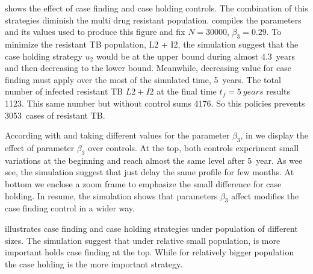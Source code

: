 %
	 shows the effect of case finding and 
case holding controls. The combination of this strategies diminish the multi 
drug resistant population.  compiles the 
parameters and its values used to produce this figure and fix 
$N = \num{30000}$, $\beta_3 = \num{0.29}$. To minimize the resistant TB 
population, L2 + I2, the simulation suggest that the case holding strategy 
$u_2$ would be at the upper bound during almost \SI{4.3}{years} and then 
decreasing to the lower bound. Meanwhile, decreasing value for case finding
must apply over the most of the simulated time, \SI{5}{years}. The total number 
of 
infected resistant TB $L2 + I2$  at the final time $t_f = \SI{5}{years}$ results
\num{1123}. This same number but without control sums 4176. So this policies 
prevents \SI{3053}{cases} of resistant TB.

  According with  and taking different values
for the parameter $\beta_3$, in  we display 
the effect of parameter $\beta_3$ over controls. 
At the top, both controls experiment small variations 
at the beginning and reach almost the same level after \SI{5}{year}. 
As wee see, the simulation suggest that just delay the same profile for few 
months. At bottom we enclose  a zoom frame to emphasize the small difference for
case holding. In resume, the simulation shows that parameters $\beta_3$ affect 
modifies the case finding control in a wider way.

	 illustrates case finding and case holding 
strategies under population of different sizes. The simulation suggest that
under relative small population, is more important holds case finding at the 
top. While for relatively bigger population the case holding is the more 
important strategy.

